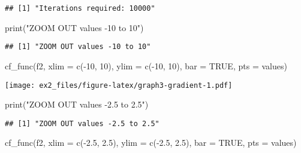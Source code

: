 \documentclass[
]{article}
\newenvironment{Shaded}{\begin{snugshade}}{\end{snugshade}}
\newcommand{\AttributeTok}[1]{\textcolor[rgb]{0.77,0.63,0.00}{#1}}
\newcommand{\ConstantTok}[1]{\textcolor[rgb]{0.00,0.00,0.00}{#1}}
\newcommand{\DecValTok}[1]{\textcolor[rgb]{0.00,0.00,0.81}{#1}}
\newcommand{\FloatTok}[1]{\textcolor[rgb]{0.00,0.00,0.81}{#1}}
\newcommand{\FunctionTok}[1]{\textcolor[rgb]{0.00,0.00,0.00}{#1}}
\newcommand{\NormalTok}[1]{#1}
\newcommand{\SpecialCharTok}[1]{\textcolor[rgb]{0.00,0.00,0.00}{#1}}
\newcommand{\StringTok}[1]{\textcolor[rgb]{0.31,0.60,0.02}{#1}}
\begin{document}
\begin{verbatim}
## [1] "Iterations required: 10000"
\end{verbatim}

\begin{Shaded}
\begin{Highlighting}[]
\FunctionTok{print}\NormalTok{(}\StringTok{"ZOOM OUT values {-}10 to 10"}\NormalTok{)}
\end{Highlighting}
\end{Shaded}

\begin{verbatim}
## [1] "ZOOM OUT values -10 to 10"
\end{verbatim}

\begin{Shaded}
\begin{Highlighting}[]
\FunctionTok{cf\_func}\NormalTok{(f2, }\AttributeTok{xlim =} \FunctionTok{c}\NormalTok{(}\SpecialCharTok{{-}}\DecValTok{10}\NormalTok{, }\DecValTok{10}\NormalTok{), }\AttributeTok{ylim =} \FunctionTok{c}\NormalTok{(}\SpecialCharTok{{-}}\DecValTok{10}\NormalTok{, }\DecValTok{10}\NormalTok{), }\AttributeTok{bar =} \ConstantTok{TRUE}\NormalTok{, }\AttributeTok{pts =}\NormalTok{ values)}
\end{Highlighting}
\end{Shaded}

\texttt{[image: ex2\_files/figure-latex/graph3-gradient-1.pdf]}

\begin{Shaded}
\begin{Highlighting}[]
\FunctionTok{print}\NormalTok{(}\StringTok{"ZOOM OUT values {-}2.5 to 2.5"}\NormalTok{)}
\end{Highlighting}
\end{Shaded}

\begin{verbatim}
## [1] "ZOOM OUT values -2.5 to 2.5"
\end{verbatim}

\begin{Shaded}
\begin{Highlighting}[]
\FunctionTok{cf\_func}\NormalTok{(f2, }\AttributeTok{xlim =} \FunctionTok{c}\NormalTok{(}\SpecialCharTok{{-}}\FloatTok{2.5}\NormalTok{, }\FloatTok{2.5}\NormalTok{), }\AttributeTok{ylim =} \FunctionTok{c}\NormalTok{(}\SpecialCharTok{{-}}\FloatTok{2.5}\NormalTok{, }\FloatTok{2.5}\NormalTok{), }\AttributeTok{bar =} \ConstantTok{TRUE}\NormalTok{, }\AttributeTok{pts =}\NormalTok{ values)}
\end{Highlighting}
\end{Shaded}
\end{document}
